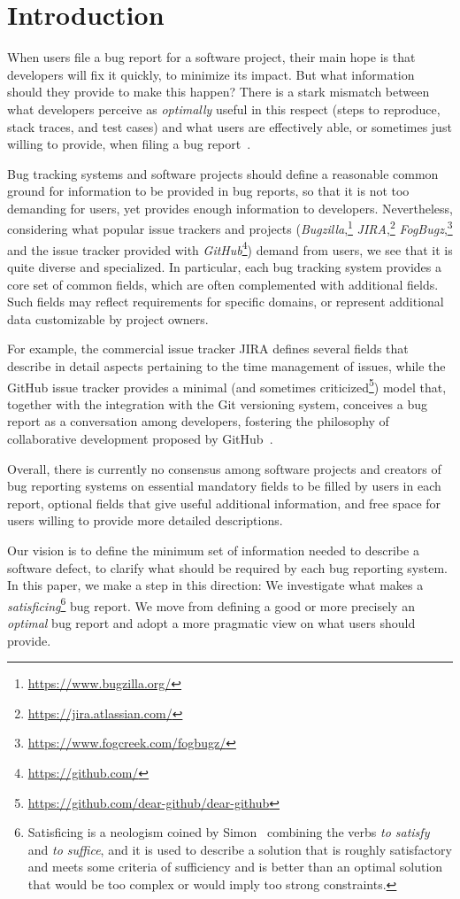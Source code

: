 \section{Introduction}

When users file a bug report for a software project, their main hope is that developers will fix it quickly, to minimize its impact. But what information should they provide to make this happen? There is a stark mismatch between what developers perceive as \emph{optimally} useful in this respect (\ie steps to reproduce, stack traces, and test cases) and what users are effectively able, or sometimes just willing to provide, when filing a bug report~\cite{Zimm2010}.

Bug tracking systems and software projects should define a reasonable common ground for information to be provided in bug reports, so that it is not too demanding for users, yet provides enough information to developers. Nevertheless, considering what popular issue trackers and projects (\eg \emph{Bugzilla},\footnote{\url{https://www.bugzilla.org/}} \emph{JIRA},\footnote{\url{https://jira.atlassian.com/}} \emph{FogBugz},\footnote{\url{https://www.fogcreek.com/fogbugz/}} and the issue tracker provided with \emph{GitHub}\footnote{\url{https://github.com/}}) demand from users, we see that it is quite diverse and specialized. In particular, each bug tracking system provides a core set of common fields, which are often complemented with additional fields. Such  fields may reflect requirements for specific domains, or represent additional data customizable by project owners. 

For example, the commercial issue tracker JIRA defines several fields that describe in detail aspects pertaining to the time management of issues, while the GitHub issue tracker provides a minimal (and sometimes criticized\footnote{\url{https://github.com/dear-github/dear-github}}) model that, together with the integration with the Git versioning system, conceives a bug report as a conversation among developers, fostering the philosophy of collaborative development proposed by GitHub~\cite{Thun2013}. 

Overall, there is currently no consensus among software projects and creators of bug reporting systems on essential mandatory fields to be filled by users in each report, optional fields that give useful additional information, and free space for users willing to provide more detailed descriptions.

Our vision is to define the minimum set of information needed to describe a software defect, to clarify what should be required by each bug reporting system. In this paper, we make a step in this direction: We investigate what makes a \emph{satisficing}\footnote{Satisficing is a neologism coined by Simon~\cite{Simo57,Simo01} combining the verbs {\em to satisfy} and {\em to suffice}, and it is used to describe a solution that is roughly satisfactory and meets some criteria of sufficiency and is better than an optimal solution that would be too complex or would imply too strong constraints.} bug report. We move from defining a good or more precisely an \emph{optimal} bug report and adopt a more pragmatic view on what users should provide.

